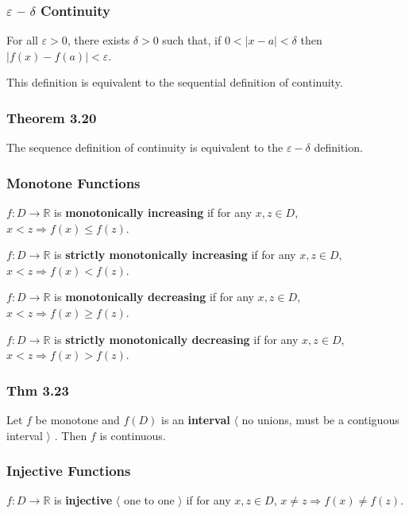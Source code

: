 \documentclass[12pt,letterpaper]{article}
\def\eps{\varepsilon{}}
\newcommand{\R}{{\mathbb R}}
\newcommand{\btw}[1]{
    $\langle$ #1 $\rangle$
}
\begin{document}
\begin{multicols*}{2}
        \subsubsection{$\eps$ -- $\delta$ Continuity}

        For all $\eps > 0$, there exists $\delta > 0$ such that, if $0 < |x - a|
        < \delta$ then $|f(x) - f(a)| < \eps$.

        This definition is equivalent to the sequential definition of
        continuity.

        \subsubsection{Theorem 3.20}

        The sequence definition of continuity is equivalent to the $\eps -
        \delta$ definition.

        \subsubsection{Monotone Functions}

        $f: D \rightarrow \R$ is {\bf monotonically increasing} if for any $x, z
        \in D$, $x < z \Rightarrow f(x) \le f(z)$.

        $f: D \rightarrow \R$ is {\bf strictly monotonically increasing} if for any $x, z
        \in D$, $x < z \Rightarrow f(x) < f(z)$.

        $f: D \rightarrow \R$ is {\bf monotonically decreasing} if for any $x, z
        \in D$, $x < z \Rightarrow f(x) \ge f(z)$.

        $f: D \rightarrow \R$ is {\bf strictly monotonically decreasing} if for any $x, z
        \in D$, $x < z \Rightarrow f(x) > f(z)$.


        \subsubsection{Thm 3.23}

        Let $f$ be monotone and $f(D)$ is an {\bf interval} \btw{no unions, must
        be a contiguous interval}. Then $f$ is continuous.

        \subsubsection{Injective Functions}

        $f: D \rightarrow \R$ is {\bf injective} \btw{one to one} if for any $x,
        z \in D$, $x \ne z \Rightarrow f(x) \ne f(z)$.


\end{multicols*}
\end{document}
